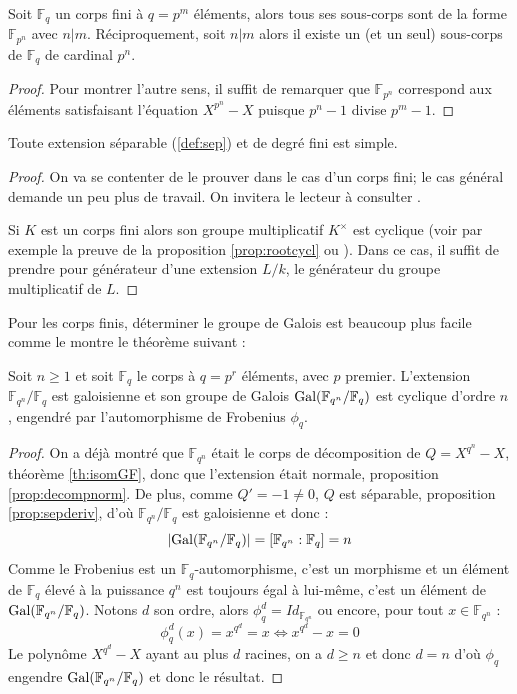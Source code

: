 \documentclass[a4paper]{article} %
\numberwithin{section}{part}
\numberwithin{equation}{section}
\newcommand\GF[1]{\mathbb{F}_{#1}}
\begin{document}
\begin{prop}
Soit $\GF{q}$ un corps fini à $q = p^m$ éléments, alors tous ses sous-corps sont
de la forme $\GF{p^n}$ avec $n|m$. Réciproquement, soit $n|m$ alors il existe un
(et un seul) sous-corps de $\GF{q}$ de cardinal $p^n$.
\end{prop}
\begin{proof}
Pour montrer l'autre sens, il suffit de remarquer que $\GF{p^n}$ correspond aux
éléments satisfaisant l'équation $X^{p^n} - X$ puisque $p^n - 1$ divise $p^m -
1$.
\end{proof}

\begin{thm}
\label{th:elemprim}
Toute extension séparable (\ref{def:sep}) et de degré fini est simple.
\end{thm}
\begin{proof}
On va se contenter de le prouver dans le cas d'un corps fini; le cas général
demande un peu plus de travail. On invitera le lecteur à consulter
\cite[p.~87]{Esc}.\par
Si $K$ est un corps fini alors son groupe multiplicatif $K^{\times}$ est
cyclique (voir par exemple la preuve de la proposition \ref{prop:rootcycl} ou
\cite[p.~50]{LiNi1}). Dans ce cas, il suffit de prendre pour générateur d'une
extension $L/k$, le générateur du groupe multiplicatif de $L$.
\end{proof}

Pour les corps finis, déterminer le groupe de Galois est beaucoup plus facile
comme le montre le théorème suivant :

\begin{thm}
Soit $n\geq1$ et soit $\GF{q}$ le corps à $q=p^r$ éléments, avec $p$ premier.
L'extension $\GF{q^n}/\GF{q}$ est galoisienne et son groupe de Galois
$\textup{Gal}(\GF{q^n}/\GF{q})$ est cyclique d'ordre $n$, engendré par 
l'automorphisme de Frobenius $\phi_q$.
\end{thm}
\begin{proof}
On a déjà montré que $\GF{q^n}$ était le corps de décomposition de $Q = X^{q^n} 
- X$, théorème \ref{th:isomGF}, donc que l'extension était normale, proposition 
\ref{prop:decompnorm}. De plus, comme $Q' = -1 \neq 0$, $Q$ est séparable,
proposition \ref{prop:sepderiv}, d'où $\GF{q^n}/\GF{q}$ est galoisienne
et donc :
\[|\textup{Gal}(\GF{q^n}/\GF{q})| = [\GF{q^n}:\GF{q}] = n\]
Comme le Frobenius est un $\GF{q}$-automorphisme, c'est un morphisme et un 
élément de $\GF{q}$ élevé à la puissance $q^n$ est toujours égal à lui-même, 
c'est un élément de $\textup{Gal}(\GF{q^n}/\GF{q})$. Notons $d$ son ordre, alors
$\phi_q^d = Id_{\GF{q^n}}$ ou encore, pour tout $x\in\GF{q^n}$ :
\[\phi_q^d(x) = x^{q^d} = x \Leftrightarrow x^{q^d} - x = 0\]
Le polynôme $X^{q^d} - X$ ayant au plus $d$ racines, on a $d\geq n$ et donc $d =
n$ d'où $\phi_q$ engendre $\textup{Gal}(\GF{q^n}/\GF{q})$ et donc le
résultat.
\end{proof}
\end{document}
